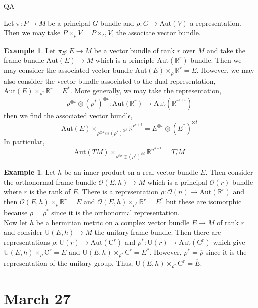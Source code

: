 QA	 \documentclass[12pt]{extarticle}
\newcommand{\R}{\mathbb{R}}
\theoremstyle{definition}
\newtheorem{example}[theorem]{Example}
\newenvironment{definition}[1][Definition:]{\begin{trivlist}
\item[\hskip \labelsep {\bfseries #1}]}{\end{trivlist}}
\newcommand{\C}[1]{\mathcal{C}^{#1}}
\renewcommand{\O}{\mathcal{O}}
\newcommand{\U}[1]{\mathrm{U}\left(#1\right)}
\begin{document}
\newcommand{\Aut}[1]{\mathrm{Aut}\left( #1 \right)}

\begin{definition}
Let $\pi : P \to M$ be a principal $G$-bundle and $\rho : G \to \Aut{V}$ a representation. Then we may take $P \times_\rho V = P \times_G V$, the associate vector bundle. 
\end{definition}

\begin{example}
Let $\pi_E : E \to M$ be a vector bundle of rank $r$ over $M$ and take the frame bundle $\Aut{E} \to M$ which is a principle $\Aut{\R^r}$-bundle. Then we may consider the associated vector bundle $\Aut{E} \times_\rho \R^r = E$. However, we may also consider the vector bundle associated to the dual representation, $\Aut{E} \times_{\rho^*} \R^r = E^*$. More generally, we may take the representation,
\[ \rho^{\otimes s} \otimes (\rho^*)^{\otimes t} : \Aut{\R^r} \to \Aut{\R^{r^{s+t}}} \]
then we find the associated vector bundle,
\[ \Aut{E} \times_{\rho^{\otimes s} \otimes (\rho^*)^{\otimes t}} \R^{r^{s + t}} = E^{\otimes s} \otimes (E^*)^{\otimes t} \]
In particular, 
\[ \Aut{TM} \times_{\rho^{\otimes s} \otimes (\rho^*)^{\otimes t}} \R^{n^{s + t}} = T^s_t M \]
\end{example}

\renewcommand{\U}{\mathrm{U}}
\renewcommand{\C}{\mathrm{C}}

\begin{example}
Let $h$ be an inner product on a real vector bundle $E$. Then consider the orthonormal frame bundle $\O(E, h) \to M$ which is a principal $\O(r)$-bundle where $r$ is the rank of $E$. There is a representation $\rho : \O(n) \to \Aut{\R^r}$ and then $\O(E, h) \times_\rho \R^r = E$ and $\O(E, h) \times_{\rho^*} \R^r = E^*$ but these are isomorphic because $\rho = \rho^*$ since it is the orthonormal representation.
\bigskip\\
Now let $h$ be a hermitian metric on a complex vector bundle $E \to M$ of rank $r$ and consider $\U(E, h) \to M$ the unitary frame bundle. Then there are representations $\rho : \U(r) \to \Aut{\C^r}$ and $\rho^* : \U(r) \to \Aut{\C^r}$ which give $\U(E, h) \times_\rho \C^r = E$ and $\U(E, h) \times_{\rho^*} \C^r = E^*$. However, $\rho^* = \overline{\rho}$ since it is the representation of the unitary group. Thus, $\U(E, h) \times_{\rho^*} \C^r = \overline{E}$. 
\end{example}

\section{March 27}
\end{document}
